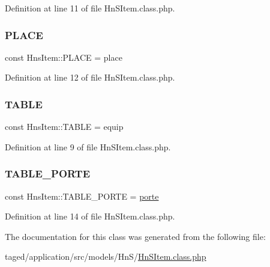 Definition at line 11 of file Hn\+S\+Item.\+class.\+php.

\mbox{\label{class_hns_item_ad9e019848a5375b3907aa3ee92310a06}} 
\subsubsection{\texorpdfstring{P\+L\+A\+CE}{PLACE}}
{\footnotesize\ttfamily const Hns\+Item\+::\+P\+L\+A\+CE = \textquotesingle{}place\textquotesingle{}}



Definition at line 12 of file Hn\+S\+Item.\+class.\+php.

\mbox{\label{class_hns_item_a579c5fb037841c2387c2965492621ac1}} 
\subsubsection{\texorpdfstring{T\+A\+B\+LE}{TABLE}}
{\footnotesize\ttfamily const Hns\+Item\+::\+T\+A\+B\+LE = \textquotesingle{}equip\textquotesingle{}}



Definition at line 9 of file Hn\+S\+Item.\+class.\+php.

\mbox{\label{class_hns_item_abfb5a1e1c7924b1d63c61c611c701b1b}} 
\subsubsection{\texorpdfstring{T\+A\+B\+L\+E\+\_\+\+P\+O\+R\+TE}{TABLE\_PORTE}}
{\footnotesize\ttfamily const Hns\+Item\+::\+T\+A\+B\+L\+E\+\_\+\+P\+O\+R\+TE = \textquotesingle{}\hyperlink{class_hns_item_a19379c2ae82def5cdf755944d8074493}{porte}\textquotesingle{}}



Definition at line 14 of file Hn\+S\+Item.\+class.\+php.



The documentation for this class was generated from the following file\+:\begin{DoxyCompactItemize}
\item 
taged/application/src/models/\+Hn\+S/\hyperlink{_hn_s_item_8class_8php}{Hn\+S\+Item.\+class.\+php}\end{DoxyCompactItemize}
